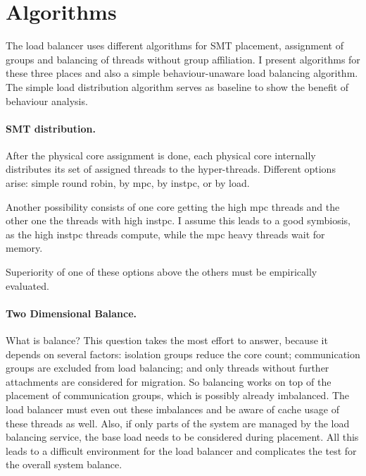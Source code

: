 \section{Algorithms}
\label{impl:algos}


The load balancer uses different algorithms for SMT placement, assignment of
groups and balancing of threads without group affiliation.
I present algorithms for these three places and also a simple behaviour-unaware
load balancing algorithm.
The simple load distribution algorithm serves as baseline to show the benefit of
behaviour analysis.

\paragraph{SMT distribution.}
After the physical core assignment is done, each physical core internally
distributes its set of assigned threads to the hyper-threads.
Different options arise: simple round robin, by \gls{mpc}, by \gls{instpc}, or
by load.

Another possibility consists of one core getting the high \gls{mpc}
threads and the other one the threads with high \gls{instpc}.
I assume this leads to a good symbiosis, as the high \gls{instpc} threads compute,
while the \gls{mpc} heavy threads wait for memory.

Superiority of one of these options above the others must be empirically evaluated.


\paragraph{Two Dimensional Balance.}
What is balance? This question takes the most effort to answer, because it
depends on several factors: isolation groups reduce the core count;
communication groups are excluded from load balancing;
and only threads without further attachments are considered for migration.
So balancing works on top of the placement of communication groups, which is
possibly already imbalanced.
The load balancer must even out these imbalances and be aware of cache usage of
these threads as well.
Also, if only parts of the system are managed by the load balancing service,
the base load needs to be considered during placement.
All this leads to a difficult environment for the load balancer and complicates
the test for the overall system balance.

